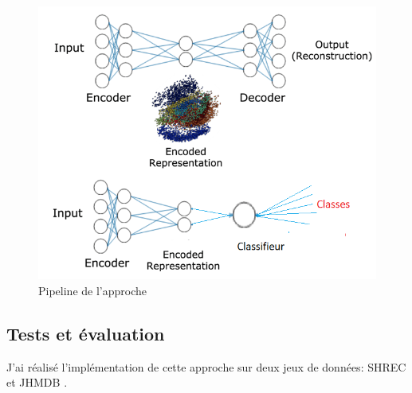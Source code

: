 \begin{figure}[H]
    \centering
    \includegraphics[width=0.8\linewidth]{Images/Autoencoder_modif.png}
    \caption{Pipeline de l'approche}
    \label{fig:AEmodif}
\end{figure}

\subsection{Tests et évaluation}
J'ai réalisé l'implémentation de cette approche sur deux jeux de données: SHREC \cite{de2017shrec} et JHMDB \cite{jhuang2013towards}.\\


